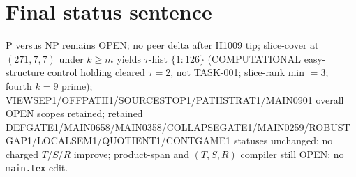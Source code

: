 \documentclass[11pt]{article}
\begin{document}
\section*{Final status sentence}
P versus NP remains OPEN; no peer delta after H1009 tip; slice-cover at $(271,7,7)$ under $k{\ge}m$ yields $\tau$-hist $\{1{:}126\}$ (COMPUTATIONAL easy-structure control holding cleared $\tau{=}2$, not TASK-001; slice-rank min $=3$; fourth $k{=}9$ prime); VIEWSEP1/OFFPATH1/SOURCESTOP1/PATHSTRAT1/MAIN0901 overall OPEN scopes retained; retained DEFGATE1/MAIN0658/MAIN0358/COLLAPSEGATE1/MAIN0259/ROBUSTGAP1/LOCALSEM1/QUOTIENT1/CONTGAME1 statuses unchanged; no charged $T$/$S$/$R$ improve; product-span and $(T,S,R)$ compiler still OPEN; no \texttt{main.tex} edit.
\end{document}

